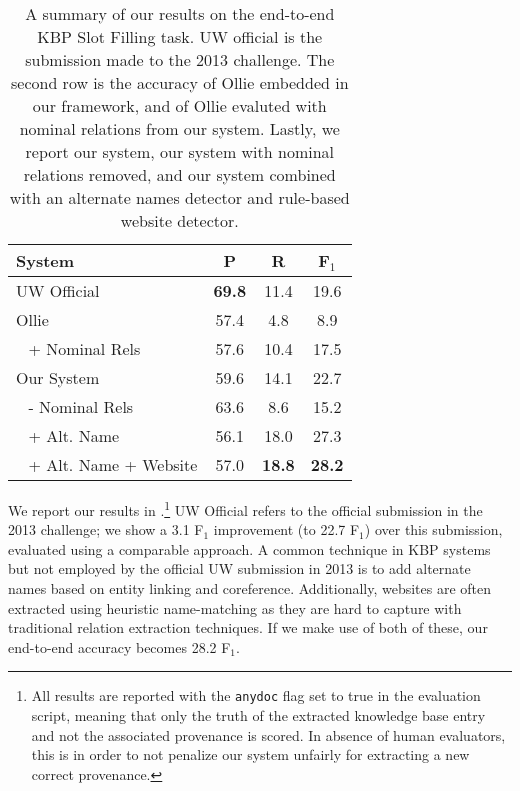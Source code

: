 \begin{table}
\begin{center}
\begin{tabular}{lccc}
\hline
\textbf{System}               & \textbf{P}    & \textbf{R}    & \textbf{F$_1$} \\
\hline
UW Official                   & \textbf{69.8} & 11.4          & 19.6 \\
\hline
Ollie                         & 57.4          & 4.8           & 8.9  \\
$~~$ + Nominal Rels           & 57.6          & 10.4          & 17.5 \\
\hline
Our System                    & 59.6          & 14.1          & 22.7 \\
$~~$ - Nominal Rels           & 63.6          & 8.6           & 15.2 \\
$~~$ + Alt. Name              & 56.1          & 18.0          & 27.3 \\
$~~$ + Alt. Name + Website    & 57.0          & \textbf{18.8} & \textbf{28.2} \\
\hline
\end{tabular}
\end{center}
\caption{\label{tab:results}
A summary of our results on the end-to-end KBP Slot Filling task.
UW official is the submission made to the 2013 challenge.
The second row is the accuracy of Ollie embedded in our framework,
  and of Ollie evaluted with nominal relations from our system.
Lastly, we report our system, our system with nominal relations removed,
  and our system combined with an alternate names detector and rule-based
  website detector.
}
\end{table}

We report our results in .\footnote{
  All results are reported with the \texttt{anydoc} flag set to true
    in the evaluation script, meaning that only the truth of the extracted
    knowledge base entry and not the associated provenance is scored.
  In absence of human evaluators, this is in order to not penalize our 
    system unfairly for extracting a new correct provenance.
  }
UW Official refers to the official submission in the 2013 challenge;
  we show a 3.1 F$_1$ improvement (to 22.7 F$_1$) over this submission, 
  evaluated using a comparable approach.
A common technique in KBP systems but not employed by the official UW
  submission in 2013 is to add alternate names 
  based on entity linking and coreference.
Additionally, websites are often extracted using heuristic name-matching
  as they are hard to capture with traditional relation extraction 
  techniques.
If we make use of both of these, our end-to-end accuracy becomes 28.2 F$_1$.

